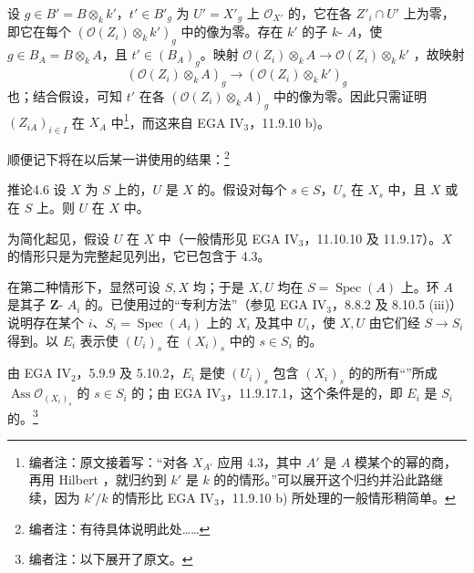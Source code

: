 设 $g\in B'=B\otimes_k k'$，$t'\in B'_g$ 为 $U'=X'_g$ 上 $\mathcal O_{X'}$ 的，它在各 $Z'_i\cap U'$ 上为零，即它在每个 $(\mathcal O(Z_i)\otimes_k k')_g$ 中的像为零。存在 $k'$ 的子 $k$- $A$，使 $g\in B_A=B\otimes_k A$，且
$t'\in(B_A)_g$。映射 $\mathcal O(Z_i)\otimes_k A\to\mathcal O(Z_i)\otimes_k k'$ ，故映射
\[(\mathcal O(Z_i)\otimes_k A)_g\longrightarrow(\mathcal O(Z_i)\otimes_k k')_g\]
也；结合假设，可知 $t'$ 在各 $(\mathcal O(Z_i)\otimes_k A)_g$ 中的像为零。因此只需证明 $(Z_{iA})_{i\in I}$ 在 $X_A$ 中\footnote{编者注：原文接着写：“对各 $X_{A'}$ 应用 4.3，其中 $A'$ 是 $A$ 模某个的幂的商，再用 Hilbert ，就归约到 $k'$ 是 $k$ 的的情形。”可以展开这个归约并沿此路继续，因为 $k'/k$ 的情形比 EGA IV$_3$，11.9.10 b) 所处理的一般情形稍简单。}，而这来自 EGA IV$_3$，11.9.10 b)。

顺便记下将在以后某一讲使用的结果：\footnote{编者注：有待具体说明此处……}
\begin{SGAresult}{推论}{4.6}
设 $X$ 为 $S$ 上的，$U$ 是 $X$ 的。假设对每个 $s\in S$，$U_s$ 在 $X_s$ 中，且 $X$ 或在 $S$ 上。则 $U$ 在 $X$ 中。
\end{SGAresult}
为简化起见，假设 $U$ 在 $X$ 中（一般情形见 EGA IV$_3$，11.10.10 及 11.9.17）。$X$ 的情形只是为完整起见列出，它已包含于 4.3。

在第二种情形下，显然可设 $S,X$ 均；于是 $X,U$ 均在 $S=\operatorname{Spec}(A)$ 上。环 $A$ 是其子 $\mathbf Z$- $A_i$ 的。已使用过的“专利方法”（参见 EGA IV$_3$，8.8.2 及 8.10.5 (iii)）说明存在某个 $i$、$S_i=\operatorname{Spec}(A_i)$ 上的 $X_i$ 及其中 $U_i$，使 $X,U$ 由它们经 $S\to S_i$ 得到。以 $E_i$ 表示使 $(U_i)_s$ 在 $(X_i)_s$ 中的 $s\in S_i$ 的。

由 EGA IV$_2$，5.9.9 及 5.10.2，$E_i$ 是使 $(U_i)_s$ 包含 $(X_i)_s$ 的的所有“”所成 $\operatorname{Ass}\mathcal O_{(X_i)_s}$ 的 $s\in S_i$ 的；由 EGA IV$_3$，11.9.17.1，这个条件是的，即 $E_i$ 是 $S_i$ 的。\footnote{编者注：以下展开了原文。}


